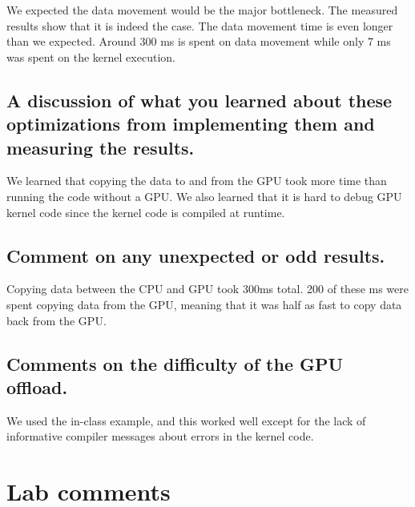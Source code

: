 \documentclass{article}
\begin{document}
We expected the data movement would be the major bottleneck. The
measured results show that it is indeed the case. The data movement
time is even longer than we expected. Around 300 ms is spent on
data movement while only 7 ms was spent on the kernel execution.

\subsection{A discussion of what you learned about these optimizations from implementing them and measuring the results.}
We learned that copying the data to and from the GPU took more time than running the code without a GPU. We also learned that it is hard to debug GPU kernel code since the kernel code is compiled at runtime.

\subsection{Comment on any unexpected or odd results.}
Copying data between the CPU and GPU took 300ms total. 200 of these ms were spent copying data from the GPU, meaning that it was half as fast to copy data back from the GPU. 


\subsection{Comments on the difficulty of the GPU offload.}
We used the in-class example, and this worked well except for the lack of informative compiler messages about errors in the kernel code.

\section{Lab comments}
\end{document}
